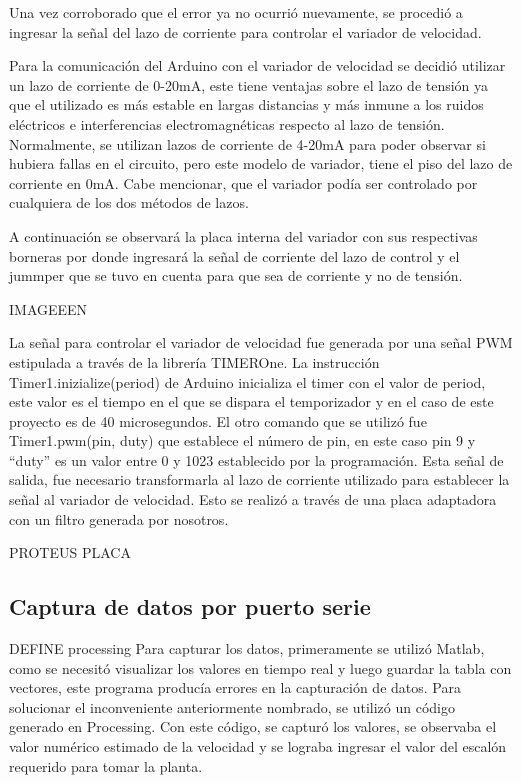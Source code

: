 Una vez corroborado que el error ya no ocurrió nuevamente, se procedió a ingresar la señal del lazo de corriente para controlar el variador de velocidad.

Para la comunicación del Arduino con el variador de velocidad se decidió utilizar un lazo de corriente de 0-20mA, este tiene ventajas sobre el lazo de tensión ya que el utilizado es más estable en largas distancias y más inmune a los ruidos eléctricos e interferencias electromagnéticas respecto al lazo de tensión. Normalmente, se utilizan lazos de corriente de 4-20mA para poder observar si hubiera fallas en el circuito, pero este modelo de variador, tiene el piso del lazo de corriente en 0mA. Cabe mencionar, que el variador podía ser controlado por cualquiera de los dos métodos de lazos.

A continuación se observará la placa interna del variador con sus respectivas borneras por donde ingresará la señal de corriente del lazo de control y el jummper que se tuvo en cuenta para que sea de corriente y no de tensión.


IMAGEEEN

La señal para controlar el variador de velocidad fue generada por una señal PWM estipulada a través de la librería TIMEROne. La instrucción Timer1.inizialize(period)
 de Arduino inicializa el timer con el valor de period, este valor es el tiempo en el que se dispara el temporizador y en el caso de este proyecto es de 40 microsegundos.
El otro comando que se utilizó fue Timer1.pwm(pin, duty) que establece el número de pin, en este caso pin 9 y “duty” es un valor entre 0 y 1023 establecido por la programación. 
Esta señal de salida, fue necesario transformarla al lazo de corriente utilizado para establecer la señal al variador de velocidad. Esto se realizó a través de una placa adaptadora con un filtro generada por nosotros.

PROTEUS PLACA


\subsection{Captura de datos por puerto serie}
DEFINE processing
Para capturar los datos, primeramente se utilizó Matlab, como se necesitó visualizar los valores en tiempo real y luego guardar la tabla con vectores, este programa producía errores en la capturación de datos.
Para solucionar el inconveniente anteriormente nombrado, se utilizó un código generado en Processing. Con este código, se capturó los valores, se observaba el valor numérico estimado de la velocidad y se lograba ingresar el valor del escalón requerido para tomar la planta.

